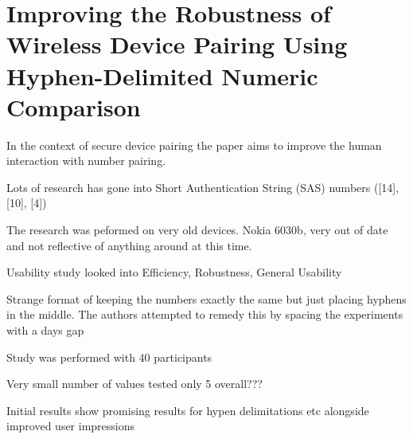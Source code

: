 \section{Improving the Robustness of Wireless Device
Pairing Using Hyphen-Delimited Numeric
Comparison}

In the context of secure device pairing the paper aims to improve the human interaction with number pairing.

Lots of research has gone into Short Authentication String (SAS) numbers ([14], [10], [4])

The research was peformed on very old devices. Nokia 6030b, very out of date and not reflective of anything around at this time.

Usability study looked into Efficiency, Robustness, General Usability

Strange format of keeping the numbers exactly the same but just placing hyphens in the middle. The authors attempted to remedy this by spacing the experiments with a days gap

Study was performed with 40 participants

Very small number of values tested only 5 overall???

Initial results show promising results for hypen delimitations etc alongside improved user impressions